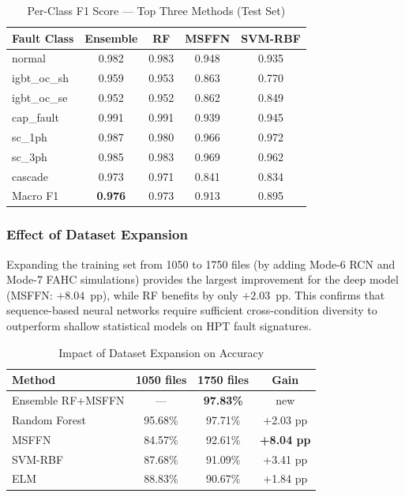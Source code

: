 \begin{table}[htbp]
\caption{Per-Class F1 Score — Top Three Methods (Test Set)}
\label{tab:perclass}
\centering
\begin{tabular}{lcccc}
\hline
Fault Class & Ensemble & RF & MSFFN & SVM-RBF \\
\hline
normal       & 0.982 & 0.983 & 0.948 & 0.935 \\
igbt\_oc\_sh & 0.959 & 0.953 & 0.863 & 0.770 \\
igbt\_oc\_se & 0.952 & 0.952 & 0.862 & 0.849 \\
cap\_fault   & 0.991 & 0.991 & 0.939 & 0.945 \\
sc\_1ph      & 0.987 & 0.980 & 0.966 & 0.972 \\
sc\_3ph      & 0.985 & 0.983 & 0.969 & 0.962 \\
cascade      & 0.973 & 0.971 & 0.841 & 0.834 \\
\hline
Macro F1     & \textbf{0.976} & 0.973 & 0.913 & 0.895 \\
\hline
\end{tabular}
\end{table}

\subsubsection{Effect of Dataset Expansion}

Expanding the training set from 1050 to 1750 files
(by adding Mode-6 RCN and Mode-7 FAHC simulations)
provides the largest improvement for the deep model
(MSFFN: $+8.04$~pp), while RF benefits by only $+2.03$~pp.
This confirms that sequence-based neural networks require
sufficient cross-condition diversity to outperform
shallow statistical models on HPT fault signatures.

\begin{table}[htbp]
\caption{Impact of Dataset Expansion on Accuracy}
\label{tab:expansion}
\centering
\begin{tabular}{lccc}
\hline
Method & 1050 files & 1750 files & Gain \\
\hline
Ensemble RF+MSFFN & — & \textbf{97.83\%} & new \\
Random Forest     & 95.68\% & 97.71\% & +2.03 pp \\
MSFFN             & 84.57\% & 92.61\% & \textbf{+8.04 pp} \\
SVM-RBF           & 87.68\% & 91.09\% & +3.41 pp \\
ELM               & 88.83\% & 90.67\% & +1.84 pp \\
\hline
\end{tabular}
\end{table}

